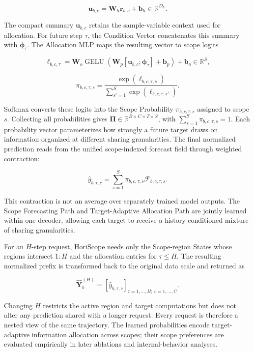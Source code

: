 \[
\mathbf u_{b,c}
=
\mathbf W_h\mathbf r_{b,c}
+
\mathbf b_h
\in\mathbb R^{D_h}.
\]


The compact summary $\mathbf u_{b,c}$ retains the sample-variable context used for allocation. For future step $\tau$, the Condition Vector concatenates this summary with $\boldsymbol\phi_\tau$. The Allocation MLP maps the resulting vector to scope logits

\[
\boldsymbol\ell_{b,c,\tau}
=
\mathbf W_o
\operatorname{GELU}\!\left(
\mathbf W_p
[\mathbf u_{b,c};\boldsymbol\phi_\tau]
+
\mathbf b_p
\right)
+
\mathbf b_o
\in\mathbb R^S,
\]


\[
\pi_{b,c,\tau,s}
=
\frac{
\exp(\ell_{b,c,\tau,s})
}{
\sum_{s'=1}^{S}
\exp(\ell_{b,c,\tau,s'})
}.
\]


Softmax converts these logits into the Scope Probability $\pi_{b,c,\tau,s}$ assigned to scope $s$. Collecting all probabilities gives $\boldsymbol\Pi\in\mathbb R^{B\times C\times T\times S}$, with $\sum_{s=1}^{S}\pi_{b,c,\tau,s}=1$. Each probability vector parameterizes how strongly a future target draws on information organized at different sharing granularities. The final normalized prediction reads from the unified scope-indexed forecast field through weighted contraction:

\[
\widehat y_{b,\tau,c}
=
\sum_{s=1}^{S}
\pi_{b,c,\tau,s}
\mathcal F_{b,c,\tau,s}.
\]


This contraction is not an average over separately trained model outputs. The Scope Forecasting Path and Target-Adaptive Allocation Path are jointly learned within one decoder, allowing each target to receive a history-conditioned mixture of sharing granularities.

For an $H$-step request, HoriScope needs only the Scope-region States whose regions intersect $1{:}H$ and the allocation entries for $\tau\leq H$. The resulting normalized prefix is transformed back to the original data scale and returned as

\[
\widehat{\mathbf Y}_b^{(H)}
=
\left[
\widehat y_{b,\tau,c}
\right]_{\tau=1,\ldots,H;\ c=1,\ldots,C}.
\]


Changing $H$ restricts the active region and target computations but does not alter any prediction shared with a longer request. Every request is therefore a nested view of the same trajectory. The learned probabilities encode target-adaptive information allocation across scopes; their scope preferences are evaluated empirically in later ablations and internal-behavior analyses.

